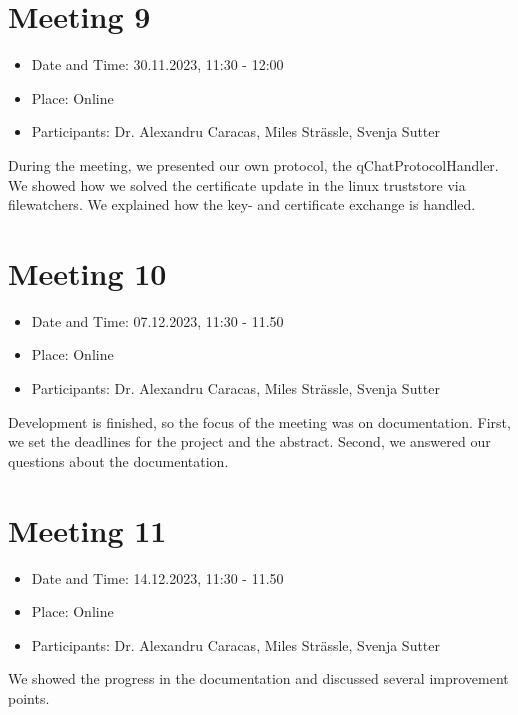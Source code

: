 \section{Meeting 9}

\begin{itemize}
    \item Date and Time: 30.11.2023, 11:30 - 12:00
    \item Place: Online
    \item Participants: Dr. Alexandru Caracas, Miles Strässle, Svenja Sutter
\end{itemize}

\noindent During the meeting, we presented our own protocol, the qChatProtocolHandler. We showed how we solved the certificate update in the linux truststore via filewatchers. We explained how the key- and certificate exchange is handled.\\

\section{Meeting 10}

\begin{itemize}
    \item Date and Time: 07.12.2023, 11:30 - 11.50
    \item Place: Online
    \item Participants: Dr. Alexandru Caracas, Miles Strässle, Svenja Sutter
\end{itemize}

\noindent Development is finished, so the focus of the meeting was on documentation. First, we set the deadlines for the project and the abstract. Second, we answered our questions about the documentation.\\


\section{Meeting 11}

\begin{itemize}
    \item Date and Time: 14.12.2023, 11:30 - 11.50
    \item Place: Online
    \item Participants: Dr. Alexandru Caracas, Miles Strässle, Svenja Sutter
\end{itemize}

\noindent We showed the progress in the documentation and discussed several improvement points.

